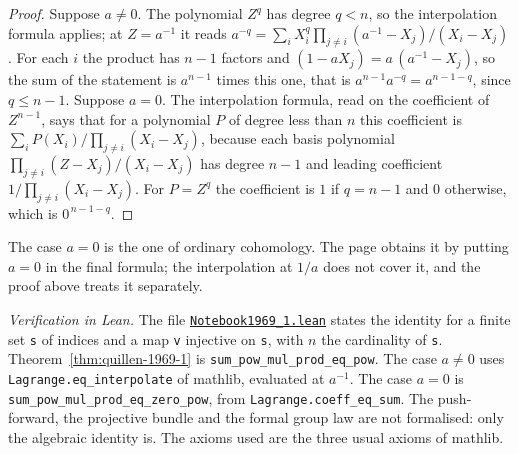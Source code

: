 \begin{proof}
Suppose $a \ne 0$. The polynomial $Z^q$ has degree $q < n$, so the interpolation formula applies; at $Z = a^{-1}$ it reads $a^{-q} = \sum_i X_i^q \prod_{j \ne i} (a^{-1} - X_j)/(X_i - X_j)$. For each $i$ the product has $n - 1$ factors and $(1 - aX_j) = a\,(a^{-1} - X_j)$, so the sum of the statement is $a^{n-1}$ times this one, that is $a^{n-1}a^{-q} = a^{n-1-q}$, since $q \le n - 1$. Suppose $a = 0$. The interpolation formula, read on the coefficient of $Z^{n-1}$, says that for a polynomial $P$ of degree less than $n$ this coefficient is $\sum_i P(X_i)/\prod_{j \ne i}(X_i - X_j)$, because each basis polynomial $\prod_{j \ne i}(Z - X_j)/(X_i - X_j)$ has degree $n - 1$ and leading coefficient $1/\prod_{j \ne i}(X_i - X_j)$. For $P = Z^q$ the coefficient is $1$ if $q = n - 1$ and $0$ otherwise, which is $0^{\,n-1-q}$.
\end{proof}

\noindent The case $a = 0$ is the one of ordinary cohomology. The page obtains it by putting $a = 0$ in the final formula; the interpolation at $1/a$ does not cover it, and the proof above treats it separately.

\emph{Verification in Lean.} The file \href{\leanblobmain/Notebook1969_1.lean}{\texttt{Notebook1969\_1.\allowbreak{}lean}} states the identity for a finite set \texttt{s} of indices and a map \texttt{v} injective on \texttt{s}, with $n$ the cardinality of \texttt{s}. Theorem~\ref{thm:quillen-1969-1} is \texttt{sum\_pow\_mul\_prod\_eq\_pow}. The case $a \ne 0$ uses \texttt{Lagrange.eq\_interpolate} of mathlib, evaluated at $a^{-1}$. The case $a = 0$ is \texttt{sum\_pow\_mul\_prod\_eq\_zero\_pow}, from \texttt{Lagrange.coeff\_eq\_sum}. The push-forward, the projective bundle and the formal group law are not formalised: only the algebraic identity is. The axioms used are the three usual axioms of mathlib.

